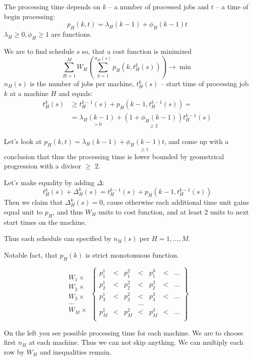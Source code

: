 \documentclass{amsart}
\begin{document}
The processing time depends on $k$ -- a number of processed jobs and
$t$ -- a time of begin processing:
\[
  p_H(k,t) = \lambda_H(k-1) + \phi_H(k-1)t
\]
$\lambda_H \geqslant 0, \phi_H \geqslant 1$ are functions.

We are to find schedule $s$ so, that a cost function is minimized
\[
  \sum_{H=1}^M W_H
    \left(
      \sum_{k=1}^{n_H(s)} p_H(k,t_H^k(s))
    \right) \to \min
\]
$n_H(s)$ is the number of jobs per machine,
$t_H^k(s)$ -- start time of processing job $k$ at a machine $H$ and
equals:
\begin{align*}
  t_H^k(s)
    & \geqslant t_H^{k-1}(s) + p_H(k-1, t_H^{k-1}(s)) = \\
    & = \underset{>0}{\lambda_H(k-1)} +
      \underset{\geqslant 2}{(1 + \phi_H(k-1))}t_H^{k-1}(s)
\end{align*}

Let's look at
$p_H(k,t) = \lambda_H(k-1) + \underset{\geqslant 1}{\phi_H(k-1)}t$,
and come up with a conclusion
that thus the processing time
is lower bounded by geometrical progression with a divisor $\geqslant$ 2.

Let's make equality by adding $\Delta$:
\[
  t_H^k(s) + \Delta_H^k(s) =
  t_H^{k-1}(s) + p_H(k-1, t_H^{k-1}(s))
\]
Then we claim that $\Delta_H^k(s) = 0$, cause otherwise each additional
time unit gains equal unit to $p_H$, and thus $W_H$ units to cost
function, and at least 2 units to next start times on the machine.

Thus each schedule can specified by $n_H(s)$ per $H=1,\dots,M$.

Notable fact, that $p_H(k)$ is strict monotonuous function.

\begin{multicols}{2}
\[
  \begin{matrix}
    W_1 \times \\
    W_2 \times \\
    W_3 \times \\
    \dots \\
    W_M \times
  \end{matrix}
  \left\{
    \begin{matrix}
      p_1^1 & < & p_1^2 & < & p_1^3 & < & \dots \\
      p_2^1 & < & p_2^2 & < & p_2^3 & < & \dots \\
      p_3^1 & < & p_3^2 & < & p_3^3 & < & \dots \\
      & & & \dots \\
      p_M^1 & < & p_M^2 & < & p_M^3 & < & \dots \\
    \end{matrix}
  \right\}
\]

\hfill

On the left you see possible processing time for each machine.
We are to choose first $n_H$ at each machine.
Thus we can not skip anything. We can multiply each row by $W_H$
and inequalities remain.
\end{multicols}
\end{document}
